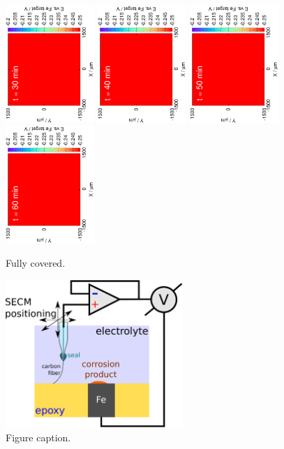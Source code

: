\documentclass[3p]{elsarticle}
\begin{document}
\begin{figure}[H]
\includegraphics[trim = 20mm 30mm 0mm 20mm, clip, width=0.3\textwidth, angle=-90]{18011705.eps} 
\includegraphics[trim = 20mm 30mm 0mm 20mm, clip, width=0.3\textwidth, angle=-90]{18011706.eps} 
\includegraphics[trim = 20mm 30mm 0mm 20mm, clip, width=0.3\textwidth, angle=-90]{18011707.eps} 
\includegraphics[trim = 20mm 30mm 0mm 20mm, clip, width=0.3\textwidth, angle=-90]{18011708.eps}
\caption{Fully covered.}
\label{fig:deconvolution}
\end{figure}


\begin{figure}[H]
\centering
\includegraphics[width=0.6\textwidth]{whisker.eps}
\caption{Figure caption.}
\label{fig:deconvolution}
\end{figure}
\end{document}
